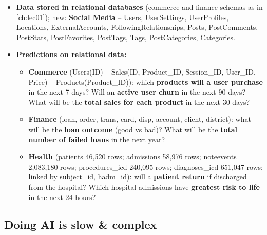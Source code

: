 \begin{itemize}
  \item \textbf{Data stored in relational databases} (commerce and finance schemas as in
    \cref{ch:lec01}); new: \textbf{Social Media} -- Users, UserSettings, UserProfiles,
    Locations, ExternalAccounts, FollowingRelationships, Posts, PostComments, PostStats,
    PostFavorites, PostTags, Tags, PostCategories, Categories.
  \item \textbf{Predictions on relational data:}
    \begin{itemize}
      \item \textbf{Commerce} (Users(ID) -- Sales(ID, Product\_ID, Session\_ID, User\_ID,
        Price) -- Products(Product\_ID)): which \textbf{products will a user purchase} in
        the next 7 days? Will an \textbf{active user churn} in the next 90 days? What will
        be the \textbf{total sales for each product} in the next 30 days?
      \item \textbf{Finance} (loan, order, trans, card, disp, account, client, district):
        what will be the \textbf{loan outcome} (good vs bad)? What will be the
        \textbf{total number of failed loans} in the next year?
      \item \textbf{Health} (patients 46,520 rows; admissions 58,976 rows; noteevents
        2,083,180 rows; procedures\_icd 240,095 rows; diagnoses\_icd 651,047 rows; linked
        by subject\_id, hadm\_id): will a \textbf{patient return} if discharged from the
        hospital? Which hospital admissions have \textbf{greatest risk to life} in the
        next 24 hours?
    \end{itemize}
\end{itemize}

\subsection{Doing AI is slow \& complex}\label{sec:lec12-slow}

